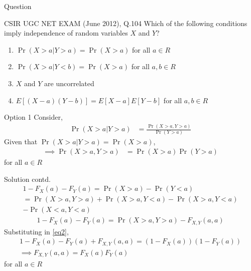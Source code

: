 \documentclass{beamer}
\providecommand{\pr}[1]{\ensuremath{\Pr\left(#1\right)}}
\providecommand{\brak}[1]{\ensuremath{\left(#1\right)}}
\providecommand{\sbrak}[1]{\ensuremath{{}\left[#1\right]}}
\begin{document}
\begin{frame}{Question}
\begin{block}{CSIR UGC NET EXAM (June 2012), Q.104}
Which of the following conditions imply independence of random variables $X$ and $Y$?
\begin{enumerate}
    \item $\pr{X>a|Y>a}=\pr{X>a} $ for all $a\in R$
    \item $\pr{X>a|Y<b}=\pr{X>a} $ for all $a,b\in R$
    \item $X$ and $Y$ are uncorrelated
    \item $E\sbrak{\brak{X-a}\brak{Y-b}}=E\sbrak{X-a}E\sbrak{Y-b}$ for all $a,b\in R$
\end{enumerate} 
\end{block}
\end{frame}
\begin{frame}{Option 1}
    Consider,
    \begin{align}
      \pr{X>a|Y>a}&=\frac{\pr{X>a,Y>a}}{\pr{Y>a}}
    \end{align}
    Given that $\pr{X>a|Y>a}=\pr{X>a}$,
    \begin{align}
        \label{eq2}\implies \pr{X>a,Y>a}&=\pr{X>a}\pr{Y>a}
    \end{align}
    for all $a\in R$
    
\end{frame}
\begin{frame}{Solution contd.}
    \begin{multline}
        1-F_X\brak{a}-F_Y\brak{a}=\pr{X>a}-\pr{Y<a}\\=\pr{X>a,Y>a}+\pr{X>a,Y<a}-\pr{X>a,Y<a}\\ -\pr{X<a,Y<a}
    \end{multline}
    \begin{align}
        1-F_X\brak{a}-F_Y\brak{a}=\pr{X>a,Y>a}-F_{X,Y}\brak{a,a}
    \end{align}
    Substituting in \eqref{eq2},
    \begin{align}
        1-F_X\brak{a}-F_Y\brak{a}+F_{X,Y}\brak{a,a}=\brak{1-F_X\brak{a}}\brak{1-F_Y\brak{a}}\\
        \implies F_{X,Y}\brak{a,a}=F_X\brak{a}F_Y\brak{a}
    \end{align}  
    for all $a\in R$
\end{frame}
\end{document}
